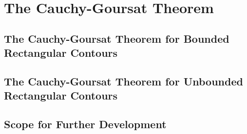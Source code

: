 \section{The Cauchy-Goursat Theorem}
\label{Ch5:Sec:Cauchy-Goursat}

\begin{comment}
Maybe begin with an anecdote - no sooner had we entered Hales's office in Pittsburgh than he asked about how we plan to deform integration contours.

Have 3 subsections.
1. Informal maths
2. Discussion of existing formalisation of closed rectangular case, with emphasis on why we don't have it for other cases (cite Hales's formalisation of the Jordan Curve Theorem in HOL-Light, maybe try and explain why we don't have something similar in Lean)
3. Discussion of our approach to the indefinite case (informally and formally)
Also maybe find better words than closed/open? Because these words are NOT used here in a topological sense, but rather in a very visual sense ("are the two endpoints of the curve the same point or are they not? Does the curve even have two endpoints or does it just have one and then go off to i\infty in the other?")
\end{comment}

\subsection{The Cauchy-Goursat Theorem for Bounded Rectangular Contours}

\subsection{The Cauchy-Goursat Theorem for Unbounded Rectangular Contours}

\subsection{Scope for Further Development}

